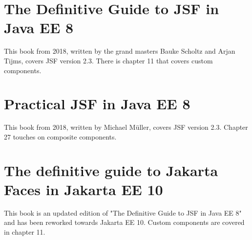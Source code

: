 \section*{The Definitive Guide to JSF in Java EE 8}
This book \cite{Scholtz2018TheDG} from 2018, written by the grand masters Bauke Scholtz and Arjan Tijms, covers JSF version 2.3.
There is chapter 11 that covers custom components.


\section*{Practical JSF in Java EE 8}
This book \cite{muller2018practicalJSF} from 2018, written by Michael Müller, covers JSF version 2.3.
Chapter 27 touches on composite components.

\section*{The definitive guide to Jakarta Faces in Jakarta EE 10}
This book \cite{Scholtz2022TheDG} is an updated edition of "The Definitive Guide to JSF in Java EE 8" and has been reworked towards Jakarta EE 10.
Custom components are covered in chapter 11.
